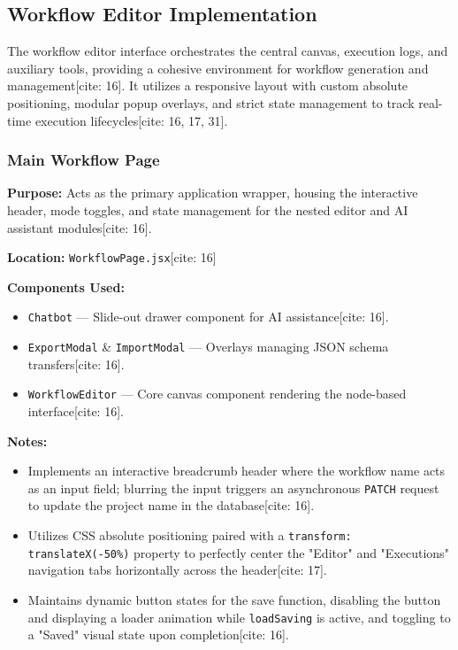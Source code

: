 \subsection{Workflow Editor Implementation}
The workflow editor interface orchestrates the central canvas, execution logs, and auxiliary tools, providing a cohesive environment for workflow generation and management[cite: 16]. It utilizes a responsive layout with custom absolute positioning, modular popup overlays, and strict state management to track real-time execution lifecycles[cite: 16, 17, 31].

\subsubsection{Main Workflow Page}

\textbf{Purpose:} Acts as the primary application wrapper, housing the interactive header, mode toggles, and state management for the nested editor and AI assistant modules[cite: 16].

\vspace{0.2cm}
\noindent\textbf{Location:} \texttt{WorkflowPage.jsx}[cite: 16]

\vspace{0.2cm}
\noindent\textbf{Components Used:}
\begin{itemize}
    \item \texttt{Chatbot} --- Slide-out drawer component for AI assistance[cite: 16].
    \item \texttt{ExportModal} \& \texttt{ImportModal} --- Overlays managing JSON schema transfers[cite: 16].
    \item \texttt{WorkflowEditor} --- Core canvas component rendering the node-based interface[cite: 16].
\end{itemize}

\vspace{0.2cm}
\noindent\textbf{Notes:}
\begin{itemize}
    \item Implements an interactive breadcrumb header where the workflow name acts as an input field; blurring the input triggers an asynchronous \texttt{PATCH} request to update the project name in the database[cite: 16].
    \item Utilizes CSS absolute positioning paired with a \texttt{transform: translateX(-50\%)} property to perfectly center the "Editor" and "Executions" navigation tabs horizontally across the header[cite: 17].
    \item Maintains dynamic button states for the save function, disabling the button and displaying a loader animation while \texttt{loadSaving} is active, and toggling to a "Saved" visual state upon completion[cite: 16].
\end{itemize}

